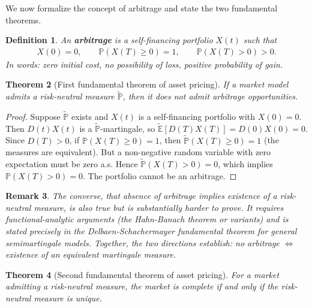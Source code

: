 \documentclass{report}
\theoremstyle{spacedplain}
\newtheorem{theorem}{Theorem}[section]
\theoremstyle{spaceddefinition}
\newtheorem{definition}[theorem]{Definition}
\theoremstyle{spacedremark}
\newtheorem{remark}[theorem]{Remark}
\begin{document}
We now formalize the concept of arbitrage and state the two fundamental theorems.

\begin{definition}
An \textbf{arbitrage} is a self-financing portfolio $X(t)$ such that
\begin{align}
    X(0) = 0, \qquad \mathbb{P}(X(T) \geq 0) = 1, \qquad \mathbb{P}(X(T) > 0) > 0.
\end{align}
In words: zero initial cost, no possibility of loss, positive probability of gain.
\end{definition}

\begin{theorem}[First fundamental theorem of asset pricing]
If a market model admits a risk-neutral measure $\widetilde{\mathbb{P}}$, then it does not admit arbitrage opportunities.
\end{theorem}

\begin{proof}
Suppose $\widetilde{\mathbb{P}}$ exists and $X(t)$ is a self-financing portfolio with $X(0) = 0$. Then $D(t)X(t)$ is a $\widetilde{\mathbb{P}}$-martingale, so $\widetilde{\mathbb{E}}[D(T)X(T)] = D(0)X(0) = 0$. Since $D(T) > 0$, if $\mathbb{P}(X(T) \geq 0) = 1$, then $\widetilde{\mathbb{P}}(X(T) \geq 0) = 1$ (the measures are equivalent). But a non-negative random variable with zero expectation must be zero a.s. Hence $\widetilde{\mathbb{P}}(X(T) > 0) = 0$, which implies $\mathbb{P}(X(T) > 0) = 0$. The portfolio cannot be an arbitrage.
\end{proof}

\begin{remark}
The converse, that absence of arbitrage implies existence of a risk-neutral measure, is also true but is substantially harder to prove. It requires functional-analytic arguments (the Hahn-Banach theorem or variants) and is stated precisely in the Delbaen-Schachermayer fundamental theorem for general semimartingale models. Together, the two directions establish: \emph{no arbitrage $\Longleftrightarrow$ existence of an equivalent martingale measure}.
\end{remark}

\begin{theorem}[Second fundamental theorem of asset pricing]
For a market admitting a risk-neutral measure, the market is complete if and only if the risk-neutral measure is unique.
\end{theorem}
\end{document}

